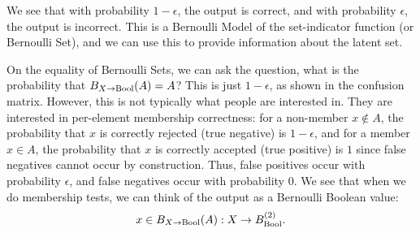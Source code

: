 \documentclass[../main.tex]{subfiles}
\begin{document}
We see that with probability $1-\epsilon$, the output is correct, and with probability $\epsilon$, the output is incorrect. This is a Bernoulli Model of the set-indicator function (or Bernoulli Set), and we can use this to provide information about the latent set.

On the equality of Bernoulli Sets, we can ask the question, what is the probability that $B_{X \to \mathrm{Bool}}(A) = A$? This is just $1-\epsilon$, as shown in the confusion matrix. However, this is not typically what people are interested in. They are interested in per-element membership correctness: for a non-member $x \notin A$, the probability that $x$ is correctly rejected (true negative) is $1 - \epsilon$, and for a member $x \in A$, the probability that $x$ is correctly accepted (true positive) is $1$ since false negatives cannot occur by construction. Thus, false positives occur with probability $\epsilon$, and false negatives occur with probability $0$. We see that when we do membership tests, we can think of the output as a Bernoulli Boolean value:
\begin{equation}
    x \in B_{X \to \mathrm{Bool}}(A) : X \to B_{\mathrm{Bool}}^{(2)}.
\end{equation}
\end{document}

